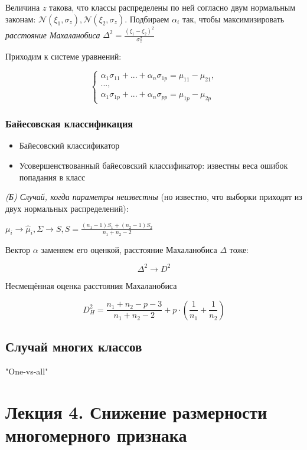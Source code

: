\documentclass[main.tex]{subfiles}
\begin{document}
Величина $ z $ такова, что классы распределены по ней согласно двум нормальным законам: $ \mathcal{N}(\xi_1, \sigma_z), \mathcal{N}(\xi_2, \sigma_z) $.
Подбираем $ \alpha_i $ так, чтобы максимизировать \emph{расстояние Махаланобиса} $ \Delta^2 = \frac{(\xi_1 - \xi_2)^2}{\sigma_z^2} $

Приходим к системе уравнений:

\[
\begin{cases}
\alpha_1 \sigma_{11} + ... + \alpha_n \sigma_{1p} = \mu_{11} - \mu_{21}, \\
...,\\
\alpha_1 \sigma_{1p} + ... + \alpha_n \sigma_{pp} = \mu_{1p} - \mu_{2p}
\end{cases}
\]

\subsubsection{Байесовская классификация}

\begin{itemize}[noitemsep]
	\item Байесовский классификатор
	\item Усовершенствованный байесовский классификатор: известны веса ошибок попадания в класс
\end{itemize}

\emph{(Б) Случай, когда параметры неизвестны} (но известно, что выборки приходят из двух нормальных распределений):

$ \mu_i \to \hat \mu_i, \Sigma \to S, S = \frac{(n_1 - 1) S_1 + (n_2 - 1) S_2}{n_1 + n_2 - 2} $

Вектор $ \alpha $ заменяем его оценкой, расстояние Махаланобиса $\Delta$ тоже:

$$ \Delta^2 \to D^2 $$

Несмещённая оценка расстояния Махаланобиса

$$ D^2_H = \frac{n_1 + n_2 - p - 3}{n_1 + n_2 - 2} + p \cdot \left(\frac{1}{n_1} + \frac{1}{n_2}\right) $$

\subsection{Случай многих классов}

"One-vs-all"

\section{Лекция 4. Снижение размерности многомерного признака}
\end{document}
